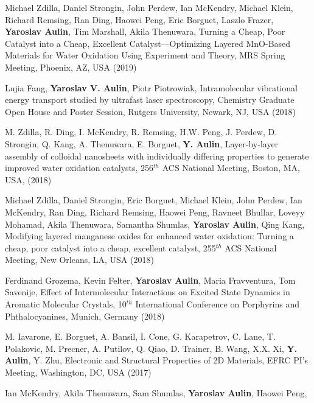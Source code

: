 \documentclass[11pt,letterpaper,sans]{moderncv} %
\begin{document}
\begin{etaremune}
	\item Michael Zdilla, Daniel Strongin, John Perdew, Ian McKendry,
	      Michael Klein, Richard Remsing, Ran Ding, Haowei Peng, Eric Borguet, Laszlo Frazer, 
	      \textbf{Yaroslav Aulin}, Tim Marshall, Akila Thenuwara,
	      Turning a Cheap, Poor Catalyst into a Cheap, Excellent Catalyst—Optimizing
	      Layered MnO-Based Materials for Water Oxidation Using Experiment and Theory,
	      MRS Spring Meeting, Phoenix, AZ, USA (2019)
	\item Lujia Fang, \textbf{Yaroslav V. Aulin}, Piotr Piotrowiak,
	      Intramolecular vibrational energy transport studied
	      by ultrafast laser spectroscopy, Chemistry Graduate Open House and Poster Session,
	      Rutgers University, Newark, NJ, USA (2018)
	\item M. Zdilla, R. Ding, I. McKendry, R. Remsing, H.W. Peng, J. Perdew, D. Strongin, 
	      Q. Kang, A. Thenuwara, E. Borguet, \textbf{Y. Aulin}, 
	      Layer-by-layer assembly of colloidal nanosheets with individually
	      differing properties to generate improved water oxidation catalysts,
	      256$^{th}$ ACS National Meeting, Boston, MA, USA, (2018)
	\item Michael Zdilla, Daniel Strongin, Eric Borguet, Michael Klein, John Perdew,
	      Ian McKendry, Ran Ding, Richard Remsing, Haowei Peng, Ravneet Bhullar,
	      Loveyy Mohamad, Akila Thenuwara, Samantha Shumlas, \textbf{Yaroslav Aulin},
	      Qing Kang,
	      Modifying layered manganese oxides for enhanced water oxidation: Turning a
	      cheap, poor catalyst into a cheap, excellent catalyst,
	      255$^{th}$ ACS National Meeting, New Orleans, LA, USA (2018)
       \item  Ferdinand Grozema, Kevin Felter, \textbf{Yaroslav Aulin}, Maria Fravventura, 
              Tom Savenije, Effect of Intermolecular Interactions on Excited State Dynamics
              in Aromatic Molecular Crystals, 10$^{th}$ International Conference
              on Porphyrins and Phthalocyanines, Munich, Germany (2018)
       \item M. Iavarone, E. Borguet, A. Bansil, I. Cone, G. Karapetrov, C. Lane, 
             T. Polakovic, M. Precner, A. Putilov, Q. Qiao, D. Trainer, B. Wang, X.X. Xi,
             \textbf{Y. Aulin}, Y. Zhu, Electronic and Structural Properties of 2D
             Materials, EFRC PI’s Meeting, Washington, DC, USA (2017)
       \item Ian McKendry, Akila Thenuwara, Sam Shumlas, \textbf{Yaroslav Aulin}, Haowei Peng,

\end{etaremune}
\end{document}
